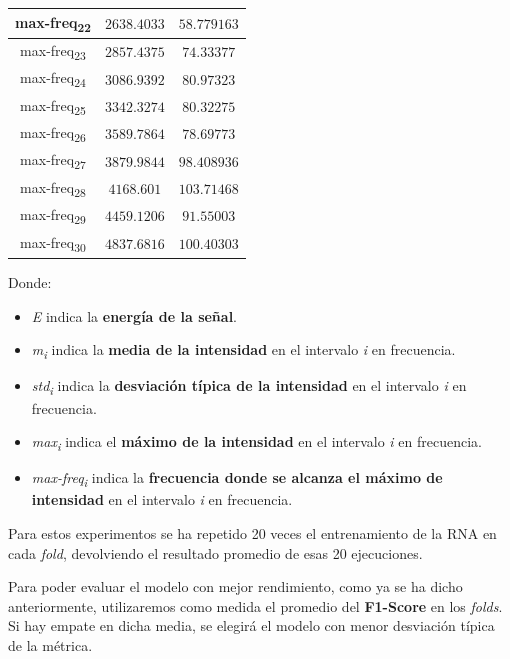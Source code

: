 \documentclass[12pt]{article}
\begin{document}
\begin{table}
\begin{tabular}{||c c c||}
			\hline
			max-freq\textsubscript{22} & $2638.4033$ & $58.779163$ \\
			\hline
			max-freq\textsubscript{23} & $2857.4375$ & $74.33377$ \\
			\hline
			max-freq\textsubscript{24} & $3086.9392$ & $80.97323$ \\
			\hline
			max-freq\textsubscript{25} & $3342.3274$ & $80.32275$ \\
			\hline
			max-freq\textsubscript{26} & $3589.7864$ & $78.69773$ \\
			\hline
			max-freq\textsubscript{27} & $3879.9844$ & $98.408936$ \\
			\hline
			max-freq\textsubscript{28} & $4168.601$ & $103.71468$ \\
			\hline
			max-freq\textsubscript{29} & $4459.1206$ & $91.55003$ \\
			\hline
			max-freq\textsubscript{30} & $4837.6816$ & $100.40303$ \\
			\hline
		\end{tabular}
	\label{Tab:Features_3_4}
\end{table}



Donde:
\begin{itemize}
	\item \textit{E} indica la \textbf{energía de la señal}.
	\item \textit{m\textsubscript{i}} indica la \textbf{media de la intensidad} en el intervalo \textit{i} en frecuencia.
	\item \textit{std\textsubscript{i}} indica la \textbf{desviación típica de la intensidad} en el intervalo \textit{i} en frecuencia.
	\item \textit{max\textsubscript{i}} indica el \textbf{máximo de la intensidad} en el intervalo \textit{i} en frecuencia.
	\item \textit{max-freq\textsubscript{i}} indica la \textbf{frecuencia donde se alcanza el máximo de intensidad} en el intervalo \textit{i} en frecuencia.
\end{itemize}	


\bigskip
Para estos experimentos se ha repetido 20 veces el entrenamiento de la RNA en cada \textit{fold}, devolviendo el resultado promedio de esas 20 ejecuciones.

\bigskip
Para poder evaluar el modelo con mejor rendimiento, como ya se ha dicho anteriormente, utilizaremos como medida el promedio
del \textbf{F1-Score} en los \textit{folds}. Si hay empate en dicha media, se elegirá el modelo con menor
desviación típica de la métrica.
\end{document}
